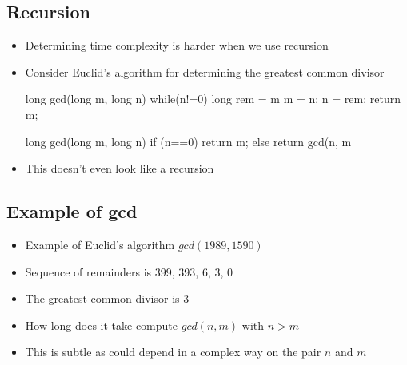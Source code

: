
\begin{slide}
\section[-1]{Recursion}

\begin{PauseHighLight}
  \begin{itemize}
  \item Determining time complexity is harder when we use
    recursion\pause
  \item Consider Euclid's algorithm for determining the greatest common
    divisor

    \begin{minipage}{11cm}
\begin{java}
  long gcd(long m, long n)
  {
    while(n!=0) {
      long rem = m%
      m = n;
      n = rem;
    }
    return m;
  }
\end{java} \pause
    \end{minipage}\hfill%
    \begin{minipage}{11cm}
\begin{java}
  long gcd(long m, long n)
  {
    if (n==0)
      return m;
    else
      return gcd(n, m%
  }
\end{java}  \pause 
    \end{minipage}
\item This doesn't even look like a recursion\pause
  \end{itemize}
\end{PauseHighLight}

\end{slide}


\begin{slide}
\section{Example of gcd}

\begin{PauseHighLight}
  \begin{itemize}
  \item Example of Euclid's algorithm \jl$gcd(1989,1590)$\pause
  \item Sequence of remainders is 399, 393, 6, 3, 0\pause
  \item The greatest common divisor is 3\pause
  \item How long does it take compute \jl$gcd(n,m)$ with $n>m$\pause
  \item This is subtle as could depend in a complex way on the pair $n$
    and $m$\pause
  \end{itemize}
\end{PauseHighLight}

\end{slide}

